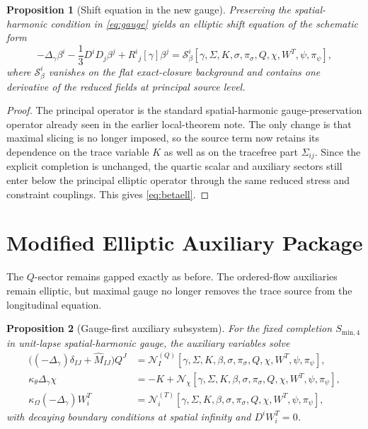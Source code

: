 \documentclass[11pt]{article}
\newtheorem{proposition}{Proposition}
\begin{document}
\begin{proposition}[Shift equation in the new gauge]
Preserving the spatial-harmonic condition in \eqref{eq:gauge} yields an elliptic shift equation of the schematic form
\begin{equation}
-\Delta_\gamma\beta^i
-\frac{1}{3}D^iD_j\beta^j
+R^i{}_j[\gamma]\beta^j
=
\mathcal S_\beta^i[\gamma,\Sigma,K,\sigma,\pi_\sigma,Q,\chi,W^T,\psi,\pi_\psi],
\label{eq:betaell}
\end{equation}
where \(\mathcal S_\beta^i\) vanishes on the flat exact-closure background and contains one derivative of the reduced fields at principal source level.
\end{proposition}

\begin{proof}
The principal operator is the standard spatial-harmonic gauge-preservation operator already seen in the earlier local-theorem note. The only change is that maximal slicing is no longer imposed, so the source term now retains its dependence on the trace variable \(K\) as well as on the tracefree part \(\Sigma_{ij}\). Since the explicit completion is unchanged, the quartic scalar and auxiliary sectors still enter below the principal elliptic operator through the same reduced stress and constraint couplings. This gives \eqref{eq:betaell}.
\end{proof}

\section{Modified Elliptic Auxiliary Package}

The \(Q\)-sector remains gapped exactly as before. The ordered-flow auxiliaries remain elliptic, but maximal gauge no longer removes the trace source from the longitudinal equation.

\begin{proposition}[Gauge-first auxiliary subsystem]
For the fixed completion \(S_{\mathrm{min},4}\) in unit-lapse spatial-harmonic gauge, the auxiliary variables solve
\begin{align}
\bigl((-\Delta_\gamma)\delta_{IJ}+\widehat M_{IJ}\bigr)Q^J
&=
\mathcal N_I^{(Q)}[\gamma,\Sigma,K,\beta,\sigma,\pi_\sigma,Q,\chi,W^T,\psi,\pi_\psi],
\label{eq:Qell}
\\
\kappa_\theta \Delta_\gamma \chi
&=
-K
+\mathcal N_\chi[\gamma,\Sigma,K,\beta,\sigma,\pi_\sigma,Q,\chi,W^T,\psi,\pi_\psi],
\label{eq:chiell}
\\
\kappa_\Omega(-\Delta_\gamma)W_i^T
&=
\mathcal N_i^{(T)}[\gamma,\Sigma,K,\beta,\sigma,\pi_\sigma,Q,\chi,W^T,\psi,\pi_\psi],
\label{eq:WTell}
\end{align}
with decaying boundary conditions at spatial infinity and \(D^iW_i^T=0\).
\end{proposition}
\end{document}
